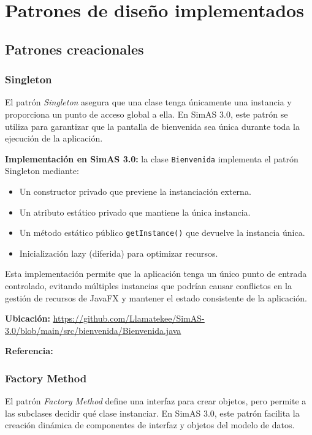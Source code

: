 \section{Patrones de diseño implementados}

\subsection{Patrones creacionales}

\subsubsection{Singleton}

El patrón \textit{Singleton} asegura que una clase tenga únicamente una instancia y proporciona un punto de acceso global a ella. En SimAS 3.0, este patrón se utiliza para garantizar que la pantalla de bienvenida sea única durante toda la ejecución de la aplicación.

\textbf{Implementación en SimAS 3.0:} la clase \texttt{Bienvenida} implementa el patrón Singleton mediante:

\begin{itemize}
    \item Un constructor privado que previene la instanciación externa.
    \item Un atributo estático privado que mantiene la única instancia.
    \item Un método estático público \texttt{getInstance()} que devuelve la instancia única.
    \item Inicialización lazy (diferida) para optimizar recursos.
\end{itemize}

Esta implementación permite que la aplicación tenga un único punto de entrada controlado, evitando múltiples instancias que podrían causar conflictos en la gestión de recursos de JavaFX y mantener el estado consistente de la aplicación.

\textbf{Ubicación:} \url{https://github.com/Llamatekee/SimAS-3.0/blob/main/src/bienvenida/Bienvenida.java}

\textbf{Referencia:} \cite[pp. 127-134]{gamma1994design}

\subsubsection{Factory Method}

El patrón \textit{Factory Method} define una interfaz para crear objetos, pero permite a las subclases decidir qué clase instanciar. En SimAS 3.0, este patrón facilita la creación dinámica de componentes de interfaz y objetos del modelo de datos.

